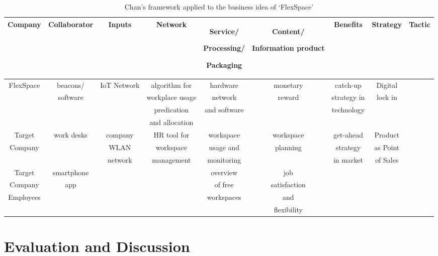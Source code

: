 			\begin{table}[h!]
			\scriptsize
			\centering			
			\caption{Chan's framework applied to the business idea of `FlexSpace'}
			\label{tab:use_case_chan}
			\centering
			\vspace{0.2cm}
			               
			\begin{tabular}{| c | c | c | c | c | c | c | c | c |}
			\hline
			\rule{0pt}{8pt}
			Company   & Collaborator & Inputs & Network & \parbox[m]{0.6in}{\centering\strut Service/ \par Processing/ \par Packaging \strut} & \parbox[m]{0.6in}{\centering\strut Content/ \par Information product \strut} & Benefits & Strategy & Tactic\\
			\hline
			FlexSpace & beacons/ & IoT Network & algorithm for   & hardware 	& monetary  & catch-up    & Digital \\
			          & software &             & workplace usage & network      & reward    & strategy in & lock in \\
			          &          &             & predication     & and software &           & technology  &         \\
			          &          &             & and allocation  &              &           &             &         \\
			\hline
			Target	  & work desks & company   & HR tool for     & workspace    & workspace & get-ahead	  & Product  \\
			Company   &            & WLAN      & workspace       & usage and    & planning  & strategy    & as Point \\
			          &            & network   & management      & monitoring   &           & in market   & of Sales \\
			\hline
			Target	  & smartphone &           &                 & overview     & job          &           &         \\
			Company   & app        &           &                 & of free      & satisfaction &           &         \\
			Employees &			   &           &                 & workspaces   & and	       &           &         \\
			&&&&&flexibility\\ \hline
			\end{tabular}
			\end{table}
\section{Evaluation and Discussion}
\label{sec:eval}
\vspace{-1em}

